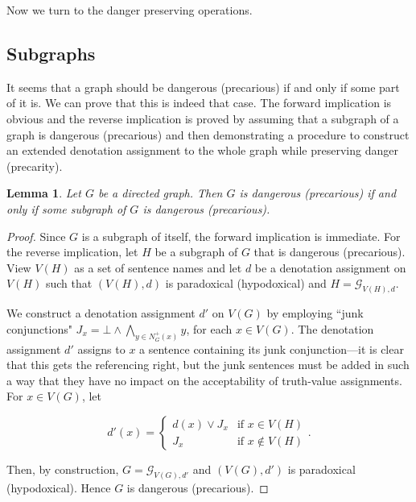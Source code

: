 \documentclass[12pt]{kluwer}
\newtheorem{lem}[thm]{Lemma}
\theoremstyle{remark}
\newcommand{\fancy}[1]{\mathcal{#1}}
\def\G{\fancy{G}}
\begin{document}
Now we turn to the danger preserving operations.

\subsection{Subgraphs}

It seems that a graph should be dangerous (precarious) if and only if some part of it is. We can prove that this is indeed that case. The forward implication is obvious and the reverse implication is proved by assuming that a subgraph of a graph is dangerous (precarious) and then demonstrating a procedure to construct an extended denotation assignment to the whole graph while preserving danger (precarity).

\begin{lem}\label{SubgraphDangerLemma}
Let $G$ be a directed graph.  Then $G$ is dangerous (precarious) if and only if some subgraph of $G$ is dangerous (precarious).
\end{lem}
\begin{proof}
Since $G$ is a subgraph of itself, the forward implication is immediate.  For the reverse implication, let $H$ be a subgraph of $G$ that is dangerous (precarious).  View $V(H)$ as a set of sentence names and let $d$ be a denotation assignment on $V(H)$ such that $(V(H), d)$ is paradoxical (hypodoxical) and
$H = \G_{V(H), d}$.

We construct a denotation assignment $d'$ on $V(G)$ by employing ``junk conjunctions" $J_x = \bot \wedge \bigwedge_{y \in N^{+}_G(x)} y$, for each $x \in V(G)$. The denotation assignment $d'$ assigns to $x$ a sentence containing its junk conjunction---it is clear that this gets the referencing right, but the junk sentences must be added in such a way that they have no impact on the acceptability of truth-value assignments. For $x \in V(G)$, let

\[d'(x) = \begin{cases}
d(x) \vee J_x & \text{if } x \in V(H) \\
J_x & \text{if } x \not \in V(H)
\end{cases}.\]

Then, by construction, $G = \G_{V(G), d'}$ and $(V(G), d')$ is paradoxical (hypodoxical).  Hence $G$ is dangerous (precarious).
\end{proof}
\end{document}
